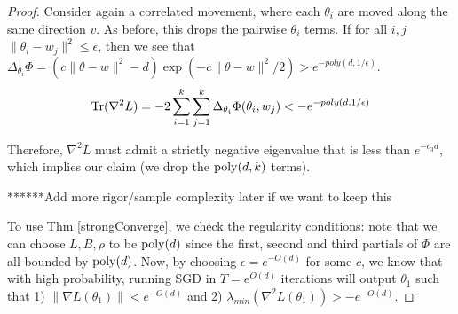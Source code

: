 \begin{proof}
Consider again a correlated movement, where each $\theta_i$ are moved along the same direction $v$. As before, this drops the pairwise $\theta_i$ terms. If for all $i, j$ $\| \theta_i - w_j \|^2 \leq \epsilon$, then we see that $\Delta_{\theta_i} \Phi = ( c\|\theta - w\|^2 -d ) \exp(-c\|\theta - w\|^2/2) > e^{-poly(d,1/\epsilon)}$. 
%
\[\operatorname{Tr}(\nabla^2 L) = -2\sum_{i=1}^k \sum_{j=1}^k \Delta_{\theta_i}\Phi(\theta_i, w_j) < -e^{-poly(d,1/\epsilon)}\]

Therefore, $\nabla^2 L$ must admit a strictly negative eigenvalue that
is less than $e^{-c_3 d}$, which implies our claim (we drop the
$\mathrm{poly}(d,k)$ terms).

******Add more rigor/sample complexity later if we want to keep this

To use Thm \ref{strongConverge}, we check the regularity conditions: note that we can choose $L, B, \rho$ to be $\mathrm{poly}(d)$ since the first, second and third partials of $\Phi$ are all bounded by $\mathrm{poly}(d)$. Now, by choosing $\epsilon = e^{-O(d)}$ for some $c$, we know that with high probability, running SGD in $T = e^{O(d)}$ iterations will output $\theta_1$ such that 1) $\|\nabla L (\theta_1)\| < e^{-O(d)}$ and 2) $\lambda_{min}(\nabla^2L(\theta_1)) > -e^{-O(d)}$.
\end{proof}

